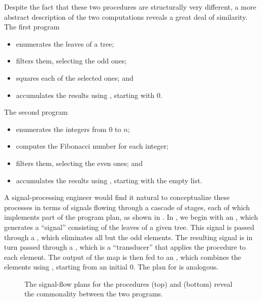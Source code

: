 Despite the fact that these two procedures are structurally very different, a more abstract description of the two computations reveals a great deal of similarity.
The first program
\begin{itemize}

	\item
		enumerates the leaves of a tree;

	\item
		filters them, selecting the odd ones;

	\item
		squares each of the selected ones; and

	\item
		accumulates the results using \code{+}, starting with \( 0 \).

\end{itemize}
The second program
\begin{itemize}

	\item
		enumerates the integers from \( 0 \) to \( n \);

	\item
		computes the Fibonacci number for each integer;

	\item
		filters them, selecting the even ones; and

	\item
		accumulates the results using , starting with the empty list.

\end{itemize}

A signal-processing engineer would find it natural to conceptualize these processes in terms of signals flowing through a cascade of stages, each of which implements part of the program plan, as shown in .
In , we begin with an , which generates a “signal” consisting of the leaves of a given tree.
This signal is passed through a , which eliminates all but the odd elements.
The resulting signal is in turn passed through a , which is a “transducer” that applies the  procedure to each element.
The output of the map is then fed to an , which combines the elements using \code{+}, starting from an initial \( 0 \).
The plan for  is analogous.

\begin{figure}[tb]
	\centering
	
	\caption{
		The signal-flow plans for the procedures  (top) and  (bottom) reveal the commonality between the two programs.
	}
	\label{Figure 2.7}
\end{figure}

